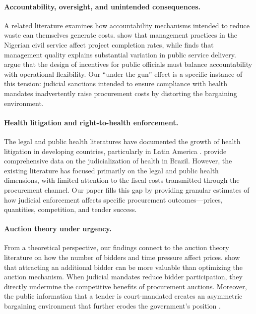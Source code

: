 \paragraph{Accountability, oversight, and unintended consequences.}
A related literature examines how accountability mechanisms intended to reduce waste can themselves generate costs. \citet{rasul2018management} show that management practices in the Nigerian civil service affect project completion rates, while \citet{williams2021bureaucratic} finds that management quality explains substantial variation in public service delivery. \citet{duflo2018obligations} argue that the design of incentives for public officials must balance accountability with operational flexibility. Our ``under the gun'' effect is a specific instance of this tension: judicial sanctions intended to ensure compliance with health mandates inadvertently raise procurement costs by distorting the bargaining environment.

\paragraph{Health litigation and right-to-health enforcement.}
The legal and public health literatures have documented the growth of health litigation in developing countries, particularly in Latin America \citep{wang2015right, ferraz2009right, biehl2009will}. \citet{cnj2019judicializacao} provide comprehensive data on the judicialization of health in Brazil. However, the existing literature has focused primarily on the legal and public health dimensions, with limited attention to the fiscal costs transmitted through the procurement channel. Our paper fills this gap by providing granular estimates of how judicial enforcement affects specific procurement outcomes---prices, quantities, competition, and tender success.

\paragraph{Auction theory under urgency.}
From a theoretical perspective, our findings connect to the auction theory literature on how the number of bidders and time pressure affect prices. \citet{bulow1996auctions} show that attracting an additional bidder can be more valuable than optimizing the auction mechanism. When judicial mandates reduce bidder participation, they directly undermine the competitive benefits of procurement auctions. Moreover, the public information that a tender is court-mandated creates an asymmetric bargaining environment that further erodes the government's position \citep{krishna2009auction}.
